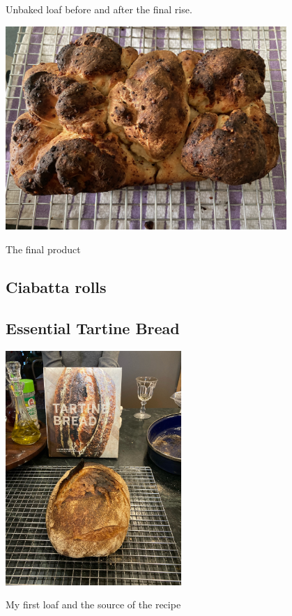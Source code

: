 \documentclass[
]{book}
\begin{document}
Unbaked loaf before and after the final rise.

\includegraphics[width=0.8\textwidth,height=\textheight]{images/drolls7.jpeg}

The final product

\hypertarget{ciabatta-rolls}{%
\subsection{Ciabatta rolls}\label{ciabatta-rolls}}

\hypertarget{tartines}{%
\subsection{Essential Tartine Bread}\label{tartines}}

\includegraphics[width=0.5\textwidth,height=\textheight]{images/FirstTartine.jpeg}

My first loaf and the source of the
recipe
\end{document}

